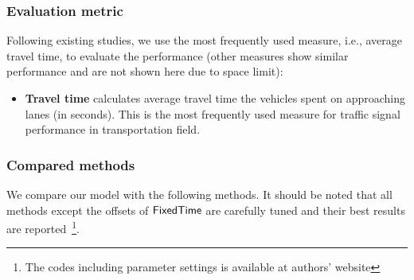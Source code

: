 \subsubsection{Evaluation metric}
Following existing studies, we use the most frequently used measure, i.e., average travel time, to evaluate the performance (other measures show similar performance and are not shown here due to space limit):

\begin{itemize}
\item  \textbf{Travel time} calculates average travel time the vehicles spent on approaching lanes (in seconds). This is the most frequently used measure for traffic signal performance in transportation field.
\end{itemize}


\subsubsection{Compared methods}
We compare our model with the following methods. It should be noted that all methods except the offsets of $\textsf{FixedTime}$ are carefully tuned and their best results are reported~\footnote{The codes including parameter settings is available at authors' website}. 

